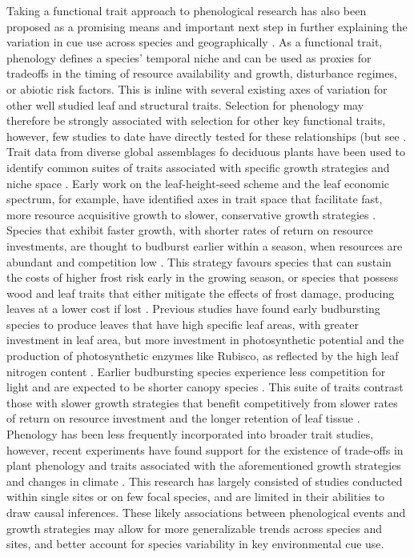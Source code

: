 \documentclass{article}\usepackage[]{graphicx}\usepackage[]{color}
\begin{document}
Taking a functional trait approach to phenological research has also been proposed as a promising means and important next step in further explaining the variation in cue use across species and geographically \citep{Flynn2018, Osada2018}. As a functional trait, phenology defines a species' temporal niche and can be used as proxies for tradeoffs in the timing of resource availability and growth, disturbance regimes, or abiotic risk factors. This is inline with several existing axes of variation for other well studied leaf and structural traits. Selection for phenology may therefore be strongly associated with selection for other key functional traits, however, few studies to date have directly tested for these relationships (but see \citep{Osada2018, Sun 2006, Lechowicz1984}. Trait data from diverse global assemblages fo deciduous plants have been used to identify common suites of traits associated with specific growth strategies and niche space \citep{Westoby1998, Wright2004, Chave2009}. Early work on the leaf-height-seed scheme and the leaf economic spectrum, for example, have identified axes in trait space that facilitate fast, more resource acquisitive growth to slower, conservative growth strategies \citep{Westoby1998, Wright2004, Diaz2016, Chave2009, Funk2016}. Species that exhibit faster growth, with shorter rates of return on resource investments, are thought to budburst earlier within a season, when resources are abundant and competition low \citep{citation}. This strategy favours species that can sustain the costs of higher frost risk early in the growing season, or species that possess wood and leaf traits that either mitigate the effects of frost damage, producing leaves at a lower cost if lost \citep{Lechowicz1984, Lenz2013}. Previous studies have found early budbursting species to produce leaves that have high specific leaf areas, with greater investment in leaf area, but more investment in photosynthetic potential and the production of photosynthetic enzymes like Rubisco, as reflected by the high leaf nitrogen content \citep{citation}. Earlier budbursting species experience less competition for light and are expected to be shorter canopy species \citep{citation}. This suite of traits contrast those with slower growth strategies that benefit competitively from slower rates of return on resource investment and the longer retention of leaf tissue \citep{citation}. Phenology has been less frequently incorporated into broader trait studies, however, recent experiments have found support for the existence of trade-offs in plant phenology and traits associated with the aforementioned growth strategies and changes in climate \citep{Suzuki1997, Ishioka2013}. This research has largely consisted of studies conducted within single sites or on few focal species, and are limited in their abilities to draw causal inferences. These likely associations between phenological events and growth strategies may allow for more generalizable trends across species and sites, and better account for species variability in key environmental cue use. 
 
\end{document}

